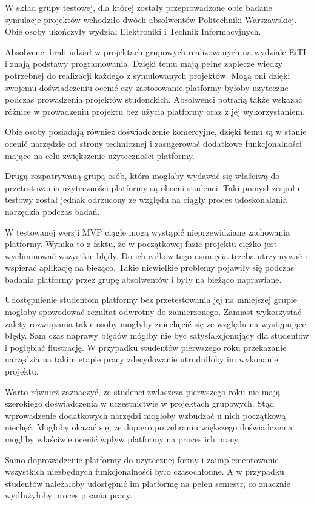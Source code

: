W skład grupy testowej, dla której zostały przeprowadzone obie badane symulacje projektów wchodziło dwóch absolwentów Politechniki Warszawskiej.
Obie osoby ukończyły wydział Elektroniki i Technik Informacyjnych.

Absolwenci brali udział w projektach grupowych realizowanych na wydziale EiTI i znają podstawy programowania.
Dzięki temu mają pełne zaplecze wiedzy potrzebnej do realizacji każdego z symulowanych projektów.
Mogą oni dzięki swojemu doświadczeniu ocenić czy zastosowanie platformy byłoby użyteczne podczas prowadzenia projektów studenckich.
Absolwenci potrafią także wskazać różnice w prowadzeniu projektu bez użycia platformy oraz z jej wykorzystaniem.

Obie osoby posiadają również doświadczenie komercyjne, dzięki temu są w stanie ocenić narzędzie od strony technicznej i zasugerować dodatkowe funkcjonalności mające na celu zwiększenie użyteczności platformy.

Drugą rozpatrywaną grupą osób, która mogłaby wydawać się właściwą do przetestowania użyteczności platformy są obecni studenci.
Taki pomysł zespołu testowy został jednak odrzucony ze względu na ciągły proces udoskonalania narzędzia podczas badań.

W testowanej wersji MVP ciągle mogą wystąpić nieprzewidziane zachowania platformy.
Wynika to z faktu, że w początkowej fazie projektu ciężko jest wyeliminować wszystkie błędy.
Do ich całkowitego usunięcia trzeba utrzymywać i wspierać aplikację na bieżąco.
Takie niewielkie problemy pojawiły się podczas badania platformy przez grupę absolwentów i były na bieżąco naprawiane.

Udostępnienie studentom platformy bez przetestowania jej na mniejszej grupie mogłoby spowodować rezultat odwrotny do zamierzonego.
Zamiast wykorzystać zalety rozwiązania takie osoby mogłyby zniechęcić się ze względu na występujące błędy.
Sam czas naprawy błędów mógłby nie być satysfakcjonujący dla studentów i pogłębiać flustrację.
W przypadku studentów pierwszego roku przekazanie narzędzia na takim etapie pracy zdecydowanie utrudniłoby im wykonanie projektu.

Warto również zaznaczyć, że studenci zwłaszcza pierwszego roku nie mają szerokiego doświadczenia w uczestnictwie w projektach grupowych.
Stąd wprowadzenie dodatkowych narzędzi mogłoby wzbudzać u nich początkową niechęć.
Mogłoby okazać się, że dopiero po zebraniu większego doświadczenia mogliby właściwie ocenić wpływ platformy na proces ich pracy.

Samo doprowadzenie platformy do użytecznej formy i zaimplementowanie wszystkich niezbędnych funkcjonalności było czasochłonne.
A w przypadku studentów należałoby udostępnić im platformę na pełen semestr, co znacznie wydłużyłoby proces pisania pracy.

